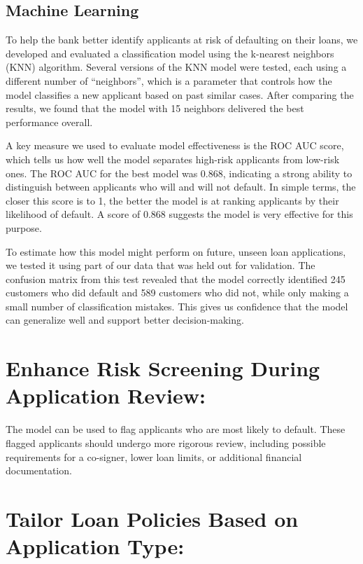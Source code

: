 \documentclass[
]{article}
\begin{document}
\subsection{Machine Learning}\label{machine-learning}

To help the bank better identify applicants at risk of defaulting on
their loans, we developed and evaluated a classification model using the
k-nearest neighbors (KNN) algorithm. Several versions of the KNN model
were tested, each using a different number of ``neighbors'', which is a
parameter that controls how the model classifies a new applicant based
on past similar cases. After comparing the results, we found that the
model with 15 neighbors delivered the best performance overall.

A key measure we used to evaluate model effectiveness is the ROC AUC
score, which tells us how well the model separates high-risk applicants
from low-risk ones. The ROC AUC for the best model was 0.868, indicating
a strong ability to distinguish between applicants who will and will not
default. In simple terms, the closer this score is to 1, the better the
model is at ranking applicants by their likelihood of default. A score
of 0.868 suggests the model is very effective for this purpose.

To estimate how this model might perform on future, unseen loan
applications, we tested it using part of our data that was held out for
validation. The confusion matrix from this test revealed that the model
correctly identified 245 customers who did default and 589 customers who
did not, while only making a small number of classification mistakes.
This gives us confidence that the model can generalize well and support
better decision-making.

\section{Enhance Risk Screening During Application
Review:}\label{enhance-risk-screening-during-application-review}

The model can be used to flag applicants who are most likely to default.
These flagged applicants should undergo more rigorous review, including
possible requirements for a co-signer, lower loan limits, or additional
financial documentation.

\section{Tailor Loan Policies Based on Application
Type:}\label{tailor-loan-policies-based-on-application-type}
\end{document}
